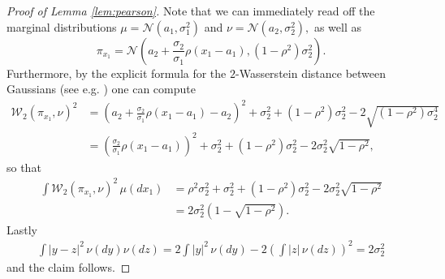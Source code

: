 \documentclass[10pt]{amsart}
\begin{document}
\begin{appendix}
\begin{proof}[Proof of Lemma \ref{lem:pearson}]
Note that we can immediately read off the marginal distributions $\mu=\mathcal{N}(a_1, \sigma_1^2)$ and $\nu=\mathcal{N}(a_2, \sigma_2^2),$ as well as $$\pi_{x_1}=\mathcal{N}\left(a_2+\frac{\sigma_2}{\sigma_1} \rho (x_1-a_1), (1-\rho^2)\sigma_2^2\right).$$
Furthermore, by the explicit formula for the $2$-Wasserstein distance between Gaussians (see e.g. \cite[Simple example]{knott1984optimal}) one can compute
\begin{align*}
\mathcal{W}_2(\pi_{x_1}, \nu)^2&= \left(a_2+\frac{\sigma_2}{\sigma_1} \rho (x_1-a_1) -a_2\right)^2 +\sigma_2^2+(1-\rho^2)\sigma_2^2-2 \sqrt{(1-\rho^2)\sigma_2^4}\\
&=\left( \frac{\sigma_2}{\sigma_1} \rho (x_1-a_1) \right)^2 +\sigma_2^2+(1-\rho^2)\sigma_2^2-2\sigma^2_2 \sqrt{1-\rho^2},
\end{align*}
so that
\begin{align*}
\int \mathcal{W}_2(\pi_{x_1}, \nu)^2 \,\mu(dx_1)&= \rho^2\sigma_2^2 +\sigma_2^2+(1-\rho^2)\sigma_2^2-2\sigma_2^2 \sqrt{1-\rho^2}\\
&=2\sigma_2^2 \left(1-\sqrt{1-\rho^2}\right).
\end{align*}
Lastly
\begin{align*}
\int |y-z|^2 \,\nu(dy)\nu(dz)= 2\int |y|^2\,\nu(dy)-2\left(\int|z|\,\nu(dz)\right)^2=2\sigma_2^2
\end{align*}
and the claim follows.
\end{proof}


\end{appendix}
\end{document}
